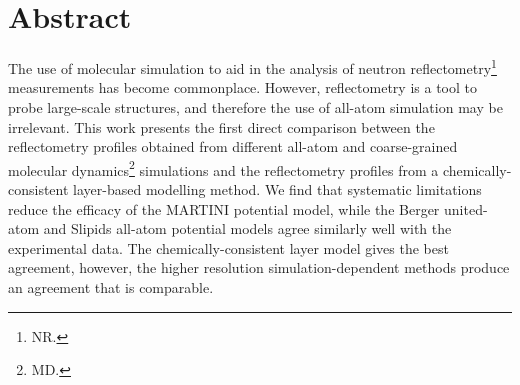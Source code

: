 \section*{Abstract}
The use of molecular simulation to aid in the analysis of neutron reflectometry\footnote{NR.} measurements has become commonplace.
However, reflectometry is a tool to probe large-scale structures, and therefore the use of all-atom simulation may be irrelevant.
This work presents the first direct comparison between the reflectometry profiles obtained from different all-atom and coarse-grained molecular dynamics\footnote{MD.} simulations and the reflectometry profiles from a chemically-consistent layer-based modelling method.
We find that systematic limitations reduce the efficacy of the MARTINI potential model, while the Berger united-atom and Slipids all-atom potential models agree similarly well with the experimental data.
The chemically-consistent layer model gives the best agreement, however, the higher resolution simulation-dependent methods produce an agreement that is comparable.
